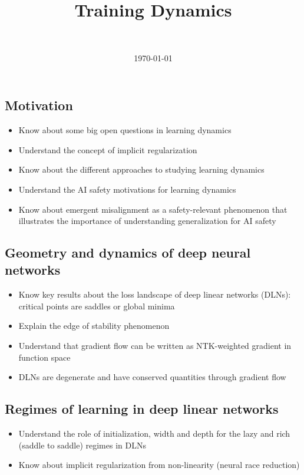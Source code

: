 \documentclass[11pt]{article}
\title{Training Dynamics}
\author{\authorname{Guillaume Corlouer}\\ \affiliation{Stormglass}}
\date{\today}
\begin{document}
\maketitle


\begin{learningoutcomes}
  \subsection*{Motivation}
  \begin{itemize}
    \item Know about some big open questions in learning dynamics
    \item Understand the concept of implicit regularization
    \item Know about the different approaches to studying learning dynamics
    \item Understand the AI safety motivations for learning dynamics
    \item Know about emergent misalignment as a safety-relevant phenomenon that illustrates the importance of understanding generalization for AI safety
  \end{itemize}

  \subsection*{Geometry and dynamics of deep neural networks}
  \begin{itemize}
    \item Know key results about the loss landscape of deep linear networks (DLNs): critical points are saddles or global minima
    \item Explain the edge of stability phenomenon
    \item Understand that gradient flow can be written as NTK-weighted gradient in function space
    \item DLNs are degenerate and have conserved quantities through gradient flow
  \end{itemize}

  \subsection*{Regimes of learning in deep linear networks}
  \begin{itemize}
    \item Understand the role of initialization, width and depth for the lazy and rich (saddle to saddle) regimes in DLNs
    \item Know about implicit regularization from non-linearity (neural race reduction)
  \end{itemize}
\end{learningoutcomes}
\end{document}

